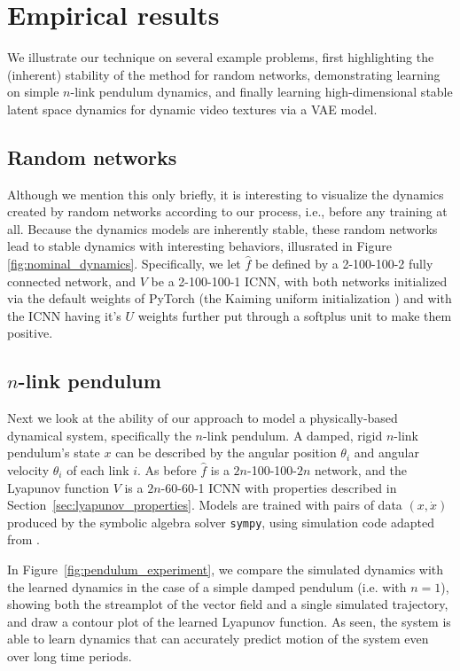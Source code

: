\section{Empirical results}

We illustrate our technique on several example problems, first highlighting the (inherent) stability of the method for random networks, demonstrating learning on simple $n$-link pendulum dynamics, and finally learning high-dimensional stable latent space dynamics for dynamic video textures via a VAE model.

\subsection{Random networks}



Although we mention this only briefly, it is interesting to visualize the dynamics created by random networks according to our process, i.e., before any training at all.  Because the dynamics models are inherently stable, these random networks lead to stable dynamics with interesting behaviors, illusrated in  Figure \ref{fig:nominal_dynamics}.  Specifically, we let $\hat{f}$ be defined by a 2-100-100-2 fully connected network, and $V$ be a 2-100-100-1 ICNN, with both networks initialized via the default weights of PyTorch (the Kaiming uniform initialization \citep{he2015delving}) and with the ICNN having it's $U$ weights further put through a softplus unit to make them positive.

\subsection{$n$-link pendulum}

Next we look at the ability of our approach to model a physically-based dynamical system, specifically the $n$-link pendulum.  A damped, rigid $n$-link pendulum's state $x$ can be described by the angular position $\theta_i$ and angular velocity $\theta_i$ of each link $i$.  As before $\hat f$ is a $2n$-100-100-$2n$ network, and the Lyapunov function $V$ is a $2n$-60-60-1 ICNN with properties described in Section~\ref{sec:lyapunov_properties}. Models are trained with pairs of data $(x, \dot x)$ produced by the symbolic algebra solver \texttt{sympy}, using simulation code adapted from \cite{vanderplas_2017}.



In Figure~\ref{fig:pendulum_experiment}, we compare the simulated dynamics with the learned dynamics in the case of a simple damped pendulum (i.e. with $n=1$), showing both the streamplot of the vector field and a single simulated trajectory, and draw a contour plot of the learned Lyapunov function. As seen, the system is able to learn dynamics that can accurately predict motion of the system even over long time periods.

